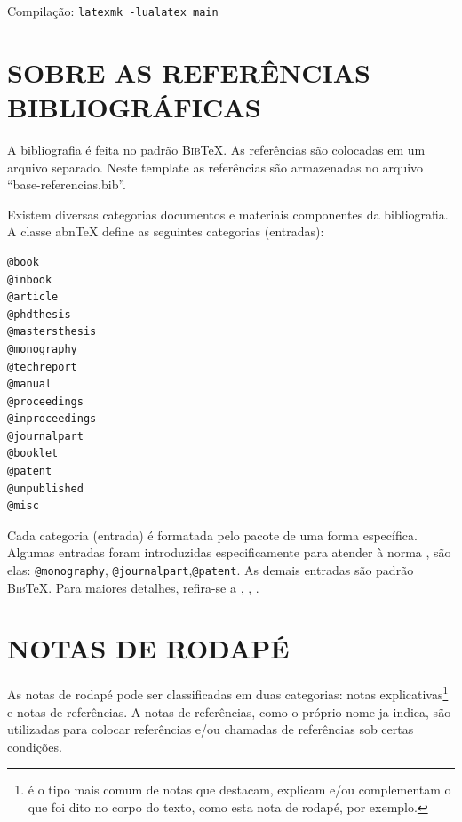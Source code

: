 Compilação: \texttt{latexmk -lualatex main}

\chapter{SOBRE AS REFERÊNCIAS BIBLIOGRÁFICAS}
\label{chap:apSobreRefer}

A bibliografia é feita no padrão \textsc{Bib}\TeX{}. As referências são colocadas em um arquivo separado. Neste template as referências são armazenadas no arquivo ``base-referencias.bib''.

Existem diversas categorias documentos e materiais componentes da bibliografia. A classe abn\TeX{} define as seguintes categorias (entradas):

\begin{verbatim}
@book
@inbook
@article
@phdthesis
@mastersthesis
@monography
@techreport
@manual
@proceedings
@inproceedings
@journalpart
@booklet
@patent
@unpublished
@misc
\end{verbatim}

Cada categoria (entrada) é formatada pelo pacote \textcite{abnTeX22014d} de uma forma específica. Algumas entradas foram introduzidas especificamente para atender à norma \textcite{NBR6023:2002}, são elas: \verb|@monography|, \verb|@journalpart|,\verb|@patent|. As demais entradas são padrão \textsc{Bib}\TeX{}. Para maiores detalhes, refira-se a \textcite{abnTeX22014d}, \textcite{abnTeX22014b}, \textcite{abnTeX22014c}.

\chapter{NOTAS DE RODAPÉ}
\label{chap:notasRodape}

As notas de rodapé pode ser classificadas em duas categorias: notas explicativas\footnote{é o tipo mais comum de notas que destacam, explicam e/ou complementam o que foi dito no corpo do texto, como esta nota de rodapé, por exemplo.} e notas de referências. A notas de referências, como o próprio nome ja indica, são utilizadas para colocar referências e/ou chamadas de referências sob certas condições.
